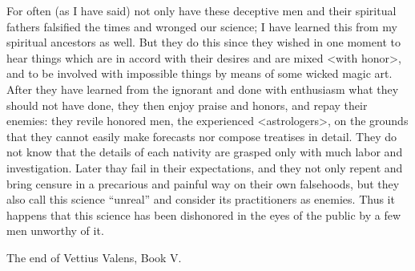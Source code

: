 For often (as I have said) not only have these deceptive men and their spiritual fathers falsified the times and wronged our science; I have learned this from my spiritual ancestors as well. But they do this
since they wished in one moment to hear things which are in accord with their desires and are mixed <with honor>, and to be involved with impossible things by means of some wicked magic art. After they have learned from the ignorant and done with enthusiasm what they should not have done, they then enjoy praise and honors, and repay their enemies: they revile honored men, the experienced <astrologers>, on the grounds that they cannot easily make forecasts nor compose treatises in detail. They do not know that the
details of each nativity are grasped only with much labor and investigation. Later thay fail in their expectations, and they not only repent and bring censure in a precarious and painful way on their own
falsehoods, but they also call this science “unreal” and consider its practitioners as enemies. Thus it happens that this science has been dishonored in the eyes of the public by a few men unworthy of it.

The end of Vettius Valens, Book V.

\newpage